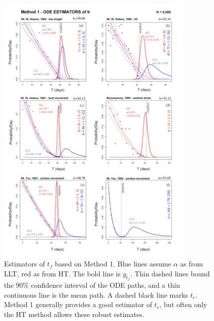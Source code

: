 \documentclass{article}
\begin{document}
\begin{figure}[H]\vskip-0.5cm
\centering
\includegraphics[width=0.85\textwidth]{Fig5_plus.png}
\caption{Estimators of $t_f$ based on Method 1. Blue lines assume $\alpha$ as from LLT, red as from HT. The bold line is $g_{t_f}$. Thin dashed lines bound the $90\%$ confidence interval of the ODE paths, and a thin continuous line is the mean path. A dashed black line marks $t_e$. Method 1 generally provides a good estimator of $t_e$, but often only the HT method allows these robust estimates.}
\label{Fig5}
\end{figure}
\end{document}
